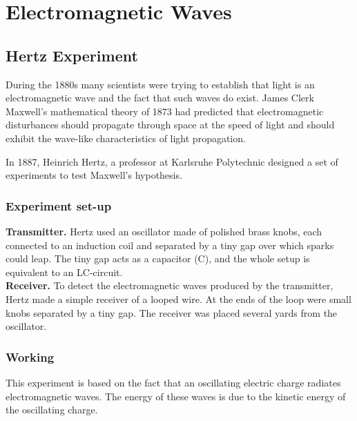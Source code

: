 \documentclass[a4paper,12pt]{BYUTextbook}
\title{\color{kj2}{\textsc{Physics Assignment}}}
\date{November 09, 2018}
\author{Karthik J}
\begin{document}
	\maketitle
	\tableofcontents
		\newpage
		\chapter*{\vspace{-1.7in}Electromagnetic Waves}
		\section{Hertz Experiment}
			During the 1880s many scientists were trying to establish that light is an electromagnetic wave and the fact that such waves do exist. James Clerk Maxwell's mathematical theory of 1873 had predicted that electromagnetic disturbances should propagate through space at the speed of light and should exhibit the wave-like characteristics of light propagation.
			
			
			
			
			
			In 1887, Heinrich Hertz, a professor at Karlsruhe Polytechnic designed a set of experiments to test Maxwell's hypothesis.
			
			\subsection{Experiment set-up}
			\textbf{Transmitter.} Hertz used an oscillator made of polished brass knobs, each connected to an induction coil and separated by a tiny gap over which sparks could leap. The tiny gap acts as a capacitor (C), and the whole setup is equivalent to an LC-circuit. 
			\\
			\textbf{Receiver.} To detect the electromagnetic waves produced by the transmitter, Hertz made a simple receiver of a looped wire. At the ends of the loop were small knobs separated by a tiny gap. The receiver was placed several yards from the oscillator.
			
			\subsection{Working}
			This experiment is based on the fact that an oscillating electric charge radiates electromagnetic waves. The energy of these waves is due to the kinetic energy of the oscillating charge.
			
\end{document}
